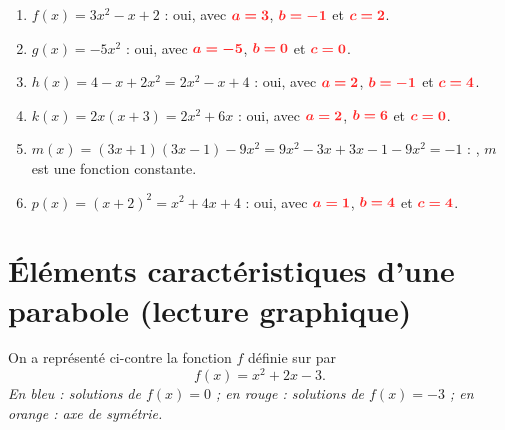 \documentclass[11pt,a4paper]{book}
\begin{document}
\begin{corrBox}
	\begin{enumerate}[label=\textbf{\alph*)}]
		\item $f(x)=3x^2-x+2$ : oui, avec $\mRouge{a=3}$, $\mRouge{b=-1}$ et $\mRouge{c=2}$.
		\item $g(x)=-5x^2$ : oui, avec $\mRouge{a=-5}$, $\mRouge{b=0}$ et $\mRouge{c=0}$.
		\item $h(x)=4-x+2x^2=2x^2-x+4$ : oui, avec $\mRouge{a=2}$, $\mRouge{b=-1}$ et $\mRouge{c=4}$.
		\item $k(x)=2x(x+3)=2x^2+6x$ : oui, avec $\mRouge{a=2}$, $\mRouge{b=6}$ et $\mRouge{c=0}$.
		\item $m(x)=(3x+1)(3x-1)-9x^2=9x^2-3x+3x-1-9x^2=-1$ : , $m$ est une fonction constante.
		\item $p(x)=(x+2)^2=x^2+4x+4$ : oui, avec $\mRouge{a=1}$, $\mRouge{b=4}$ et $\mRouge{c=4}$.
	\end{enumerate}
\end{corrBox}

\newpage

\section*{\color{green!55!black}Éléments caractéristiques d'une parabole (lecture graphique)}

\exerciceDS{}

\begin{minipage}[c]{0.5\linewidth}
	On a représenté ci-contre la fonction $f$ définie sur \R par
	$$f(x)=x^2+2x-3.$$
	\emph{En bleu : solutions de $f(x)=0$ ; en rouge : solutions de $f(x)=-3$ ; en orange : axe de symétrie.}
\end{minipage} \hfill
\begin{minipage}[c]{0.46\linewidth}
	\begin{center}
	\end{center}
\end{minipage}
\end{document}
